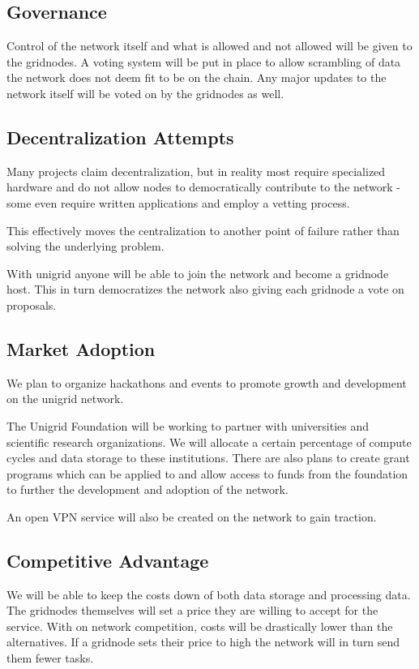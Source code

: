 \documentclass[12pt]{article}
\begin{document}
\subsection*{Governance}
Control of the network itself and what is allowed and not allowed will be given to the gridnodes. A voting system will be put in place to allow scrambling of data the network does not deem fit to be on the chain. Any major updates to the network itself will be voted on by the gridnodes as well.

\subsection*{Decentralization Attempts}

Many projects claim decentralization, but in reality most require specialized hardware and do not allow nodes to democratically contribute to the network - some even require written applications and employ a vetting process.

This effectively moves the centralization to another point of failure rather than solving the underlying problem.

With unigrid anyone will be able to join the network and become a gridnode host. This in turn democratizes the network also giving each gridnode a vote on proposals.

\subsection*{Market Adoption}
We plan to organize hackathons and events to promote growth and development on the unigrid network. 

The Unigrid Foundation will be working to partner with universities and scientific research organizations. We will allocate a certain percentage of compute cycles and data storage to these institutions. There are also plans to create grant programs which can be applied to and allow access to funds from the foundation to further the development and adoption of the network.

An open VPN service will also be created on the network to gain traction.

\subsection*{Competitive Advantage}
We will be able to keep the costs down of both data storage and processing data. The gridnodes themselves will set a price they are willing to accept for the service. With on network competition, costs will be drastically lower than the alternatives. If a gridnode sets their price to high the network will in turn send them fewer tasks.
\end{document}
